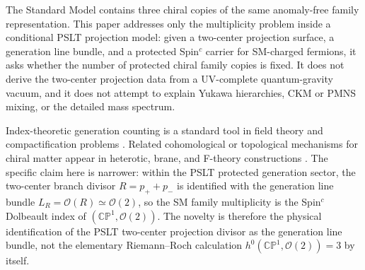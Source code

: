\documentclass[aps,prd,preprint,notitlepage,nofootinbib,superscriptaddress,floatfix]{revtex4-2}
\newcommand{\cO}{\mathcal O}
\newcommand{\CP}{\mathbb{CP}}
\theoremstyle{remark}
\begin{document}
The Standard Model contains three chiral copies of the same anomaly-free family representation.
This paper addresses only the multiplicity problem inside a conditional PSLT projection model: given a two-center projection surface, a generation line bundle, and a protected Spin\(^c\) carrier for SM-charged fermions, it asks whether the number of protected chiral family copies is fixed.
It does not derive the two-center projection data from a UV-complete quantum-gravity vacuum, and it does not attempt to explain Yukawa hierarchies, CKM or PMNS mixing, or the detailed mass spectrum.

Index-theoretic generation counting is a standard tool in field theory and compactification problems \cite{AtiyahSinger1968,LawsonMichelsohn1989}.
Related cohomological or topological mechanisms for chiral matter appear in heterotic, brane, and F-theory constructions \cite{Candelas1985,Witten1986,BraunHeOvrutPantev2005,BouchardDonagi2005,Blumenhagen2007,BeasleyHeckmanVafa2009}.
The specific claim here is narrower: within the PSLT protected generation sector, the two-center branch divisor \(R=p_+ + p_-\) is identified with the generation line bundle \(L_R=\cO(R)\simeq\cO(2)\), so the SM family multiplicity is the Spin\(^c\) Dolbeault index of \((\CP^1,\cO(2))\).
The novelty is therefore the physical identification of the PSLT two-center projection divisor as the generation line bundle, not the elementary Riemann--Roch calculation \(h^0(\CP^1,\cO(2))=3\) by itself.
\end{document}
